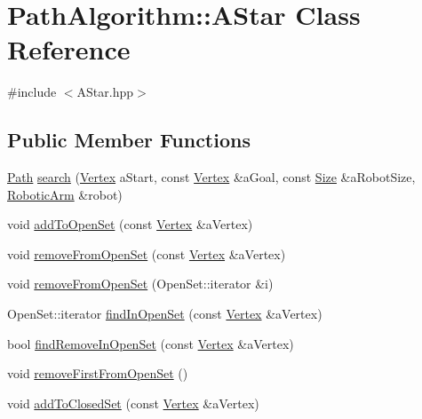 \hypertarget{class_path_algorithm_1_1_a_star}{}\section{Path\+Algorithm\+:\+:A\+Star Class Reference}
\label{class_path_algorithm_1_1_a_star}


{\ttfamily \#include $<$A\+Star.\+hpp$>$}

\subsection*{Public Member Functions}
\begin{DoxyCompactItemize}
\item 
\hyperlink{namespace_path_algorithm_a7f2958a43117506f3cb6dc9409a22c0d}{Path} \hyperlink{class_path_algorithm_1_1_a_star_aee41b31ec44b02f6dc94889d228a3582}{search} (\hyperlink{struct_path_algorithm_1_1_vertex}{Vertex} a\+Start, const \hyperlink{struct_path_algorithm_1_1_vertex}{Vertex} \&a\+Goal, const \hyperlink{struct_widgets_1_1_size}{Size} \&a\+Robot\+Size, \hyperlink{class_robotic_arm}{Robotic\+Arm} \&robot)
\item 
void \hyperlink{class_path_algorithm_1_1_a_star_a63f88f24acf7bf34cd060051134c9190}{add\+To\+Open\+Set} (const \hyperlink{struct_path_algorithm_1_1_vertex}{Vertex} \&a\+Vertex)
\item 
void \hyperlink{class_path_algorithm_1_1_a_star_afcc23a676145d6e280d1c3430af5380a}{remove\+From\+Open\+Set} (const \hyperlink{struct_path_algorithm_1_1_vertex}{Vertex} \&a\+Vertex)
\item 
void \hyperlink{class_path_algorithm_1_1_a_star_aba29c2585fbf49880cf5e8b9bf6d3eb5}{remove\+From\+Open\+Set} (Open\+Set\+::iterator \&i)
\item 
Open\+Set\+::iterator \hyperlink{class_path_algorithm_1_1_a_star_ae78bfebdee31135fdfb2f302347f962f}{find\+In\+Open\+Set} (const \hyperlink{struct_path_algorithm_1_1_vertex}{Vertex} \&a\+Vertex)
\item 
bool \hyperlink{class_path_algorithm_1_1_a_star_a657aaaf577ca25e68e6a5af57214e7d4}{find\+Remove\+In\+Open\+Set} (const \hyperlink{struct_path_algorithm_1_1_vertex}{Vertex} \&a\+Vertex)
\item 
void \hyperlink{class_path_algorithm_1_1_a_star_a5bb18edbbd54833aac9eddfe63ba652d}{remove\+First\+From\+Open\+Set} ()
\item 
void \hyperlink{class_path_algorithm_1_1_a_star_a53139e4b3cd3971a2bf85a430e83378f}{add\+To\+Closed\+Set} (const \hyperlink{struct_path_algorithm_1_1_vertex}{Vertex} \&a\+Vertex)

\end{DoxyCompactItemize}
